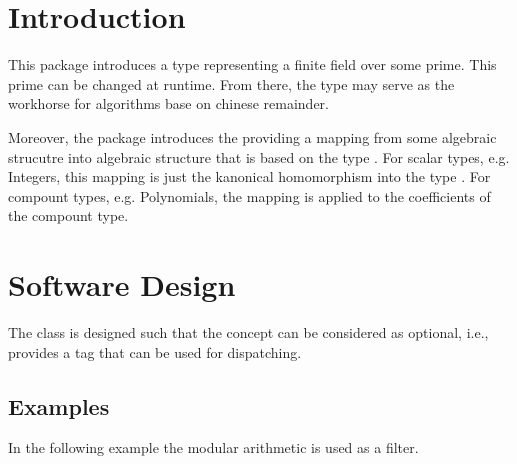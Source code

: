 \cleardoublepage
{}
\label{chap:modular_arithmetic}



\section{Introduction}

This package introduces a type  
representing a finite field over some prime. 
This prime can be changed at runtime. From there, the type may serve
as the workhorse for algorithms base on chinese remainder.  

Moreover, the package introduces the  
providing a mapping from some algebraic strucutre  into algebraic 
structure that is based on the type .  
For scalar types, e.g. Integers, this mapping is just the kanonical homomorphism
into the type . 
For compount types, e.g. Polynomials, the mapping is applied to the 
coefficients of the compount type. 

\section{Software Design}

The class  is designed such that the concept 
 can be considered as optional, i.e., 
 provides a tag that can be used for dispatching. 

\subsection{Examples}

In the following example the modular arithmetic is used as a filter. 

